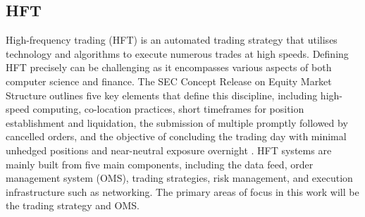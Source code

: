 \documentclass{article}
\theoremstyle{break}
\begin{document}
\subsection{HFT}
High-frequency trading (HFT) is an automated trading strategy that utilises technology and algorithms to execute numerous trades at high speeds. Defining HFT precisely can be challenging as it encompasses various aspects of both computer science and finance. The SEC Concept Release on Equity Market Structure outlines five key elements that define this discipline, including high-speed computing, co-location practices, short timeframes for position establishment and liquidation, the submission of multiple promptly followed by cancelled orders, and the objective of concluding the trading day with minimal unhedged positions and near-neutral exposure overnight \cite{1}. HFT systems are mainly built from five main components, including the data feed, order management system (OMS), trading strategies, risk management, and execution infrastructure such as networking. The primary areas of focus in this work will be the trading strategy and OMS. 
\end{document}

